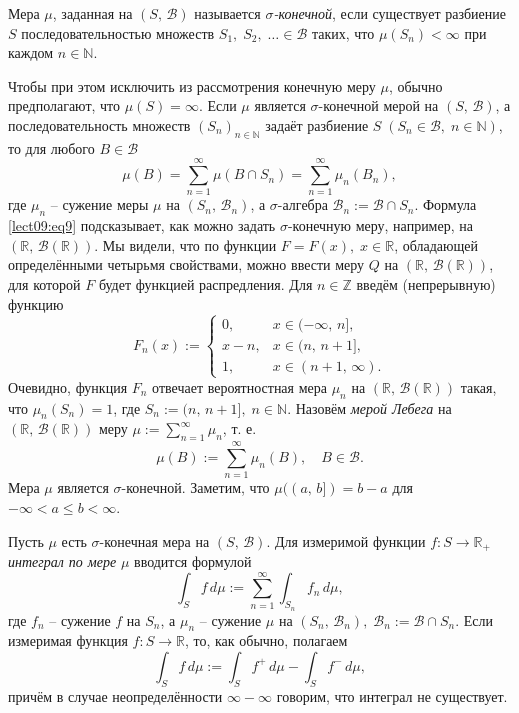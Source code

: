 \begin{definition}\label{lect09:def2}
Мера $\mu$, заданная на $(S,\,\mathcal{B})$ называется \emph{$\sigma$-конечной}, если существует разбиение $S$ последовательностью множеств $S_1,\;S_2,\;\ldots\in\mathcal{B}$ таких, что $\mu(S_n)<\infty$ при каждом $n\in\mathbb{N}$.
\end{definition}

Чтобы при этом исключить из рассмотрения конечную меру $\mu$, обычно предполагают, что $\mu(S)=\infty$. Если $\mu$ является $\sigma$-конечной мерой на $(S,\,\mathcal{B})$, а последовательность множеств $(S_n)_{n\in\mathbb{N}}$ задаёт разбиение $S\;(S_n\in\mathcal{B},\;n\in\mathbb{N})$, то для любого $B\in\mathcal{B}$
\begin{equation}\label{lect09:eq9}
\mu(B)=\sum_{n=1}^\infty\mu(B\cap S_n)=\sum_{n=1}^\infty\mu_n(B_n),
\end{equation} 
где $\mu_n$ -- сужение меры $\mu$ на $(S_n,\,\mathcal{B}_n)$, а $\sigma$-алгебра $\mathcal{B}_n:=\mathcal{B}\cap S_n$. Формула \ref{lect09:eq9} подсказывает, как можно задать $\sigma$-конечную меру, например, на $(\mathbb{R},\,\mathcal{B}(\mathbb{\mathbb{R}}))$. Мы видели, что по функции $F=F(x),\;x\in\mathbb{R}$, обладающей определёнными четырьмя свойствами, можно ввести меру $Q$ на
$(\mathbb{R},\,\mathcal{B}(\mathbb{R}))$, для которой $F$ будет функцией распредления. Для $n\in\mathbb{Z}$ введём (непрерывную) функцию
\[ 
F_n(x):=
\begin{cases}
0,&x\in(-\infty,\,n],\\
x-n,&x\in(n,\,n+1],\\
1,&x\in(n+1,\,\infty).
\end{cases}
\]
Очевидно, функция $F_n$ отвечает вероятностная мера $\mu_n$ на $(\mathbb{R},\,\mathcal{B}(\mathbb{R}))$ такая, что $\mu_n(S_n)=1$, где $S_n:=(n,\,n+1],\;n\in\mathbb{N}$. Назовём \emph{мерой Лебега} на $(\mathbb{R},\,\mathcal{B}(\mathbb{R}))$ меру $\mu:=\sum\limits_{n=1}^\infty\mu_n$, т. е.
\[ \mu(B):=\sum_{n=1}^\infty\mu_n(B),\quad B\in\mathcal{B}. \]
Мера $\mu$ является $\sigma$-конечной. Заметим, что $\mu((a,\,b])=b-a$ для $-\infty<a\leqslant b<\infty$.

\begin{definition}\label{lect09:def3}
Пусть $\mu$ есть $\sigma$-конечная мера на $(S,\,\mathcal{B})$. Для измеримой функции $f\colon S\to\mathbb{R}_+$ \emph{интеграл по мере} $\mu$ вводится формулой
\begin{equation}\label{lect09:eq10}
\int_Sf\,d\mu:=\sum_{n=1}^\infty\int_{S_n}f_n\,d\mu,
\end{equation}
где $f_n$ -- сужение $f$ на $S_n$, а $\mu_n$ -- сужение $\mu$ на $(S_n,\,\mathcal{B}_n),\;\mathcal{B}_n:=\mathcal{B}\cap S_n$. Если измеримая функция $f\colon S\to\mathbb{R}$, то, как обычно, полагаем
\[ \int_Sf\,d\mu:=\int_Sf^+\,d\mu-\int_Sf^-\,d\mu, \]
причём в случае неопределённости $\infty-\infty$ говорим, что интеграл не существует. 
\end{definition}


